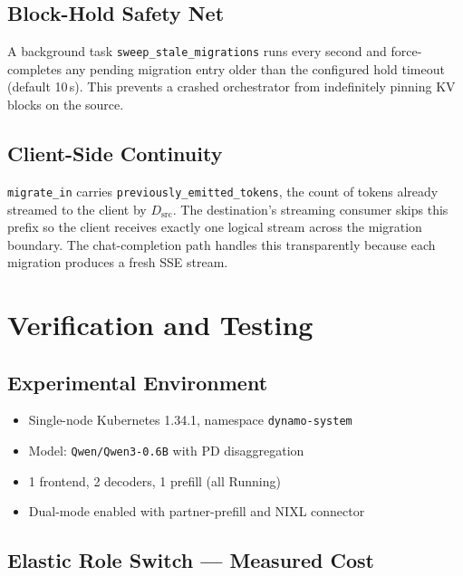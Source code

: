 \documentclass[10pt,twocolumn,letterpaper]{article}
\begin{document}
\subsection{Block-Hold Safety Net}
\label{sec:safety-net}

A background task \texttt{sweep\_stale\_migrations} runs every second and force-completes any pending migration entry older than the configured hold timeout (default 10\,s). This prevents a crashed orchestrator from indefinitely pinning KV blocks on the source.

\subsection{Client-Side Continuity}
\label{sec:client-continuity}

\texttt{migrate\_in} carries \texttt{previously\_emitted\_tokens}, the count of tokens already streamed to the client by $D_{\text{src}}$. The destination's streaming consumer skips this prefix so the client receives exactly one logical stream across the migration boundary. The chat-completion path handles this transparently because each migration produces a fresh SSE stream.

\section{Verification and Testing}
\label{sec:validation}

\subsection{Experimental Environment}
\label{sec:env}

\begin{itemize}[nosep]
\item Single-node Kubernetes 1.34.1, namespace \texttt{dynamo-system}
\item Model: \texttt{Qwen/Qwen3-0.6B} with PD disaggregation
\item 1 frontend, 2 decoders, 1 prefill (all Running)
\item Dual-mode enabled with partner-prefill and NIXL connector
\end{itemize}

\subsection{Elastic Role Switch --- Measured Cost}
\label{sec:switch-cost}
\end{document}

